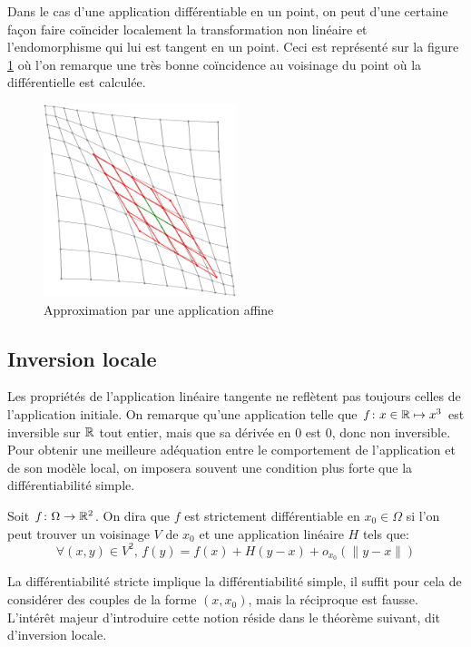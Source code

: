 Dans le cas d'une application différentiable en un point, on peut d'une certaine façon faire coïncider localement la transformation non linéaire et l'endomorphisme qui lui est tangent en un point. Ceci est représenté sur la figure \ref{fig:diffapprox} où l'on remarque une très bonne coïncidence au voisinage du point où la différentielle est calculée.

\begin{figure}[ht]
\centering
\includegraphics[width=0.5\textwidth]{images/ima4.png}
\caption{Approximation par une application affine}\label{fig:diffapprox}
\end{figure}

\subsection{Inversion locale}

Les propriétés de l'application linéaire tangente ne reflètent pas toujours celles de l'application initiale. On remarque qu'une application telle que $f \colon  x \in \mathbb{R} \mapsto x^3$ est inversible sur $\mathbb{R}$ tout entier, mais que sa dérivée en 0 est 0, donc non inversible. Pour obtenir une meilleure adéquation entre le comportement de l'application et de son modèle local, on imposera souvent une condition plus forte que la différentiabilité simple. 

\begin{fdefn}\label{def:strict_diff}
Soit $f \colon \Omega \to \mathbb{R}^2$. On dira que $f$ est strictement différentiable en $x_0 \in \Omega$ si l'on peut trouver un voisinage $V$ de $x_0$ et une application linéaire $H$ tels que:
\[
\forall (x,y) \in V^2, \, f(y) = f(x) + H(y-x) + o_{x_0}\left(\|y-x\|\right)
\]
\end{fdefn}

La différentiabilité stricte implique la différentiabilité simple, il suffit pour cela de considérer des couples de la forme $(x,x_0)$, mais la réciproque est fausse. L'intérêt majeur d'introduire cette notion réside dans le théorème suivant, dit d'inversion locale.

